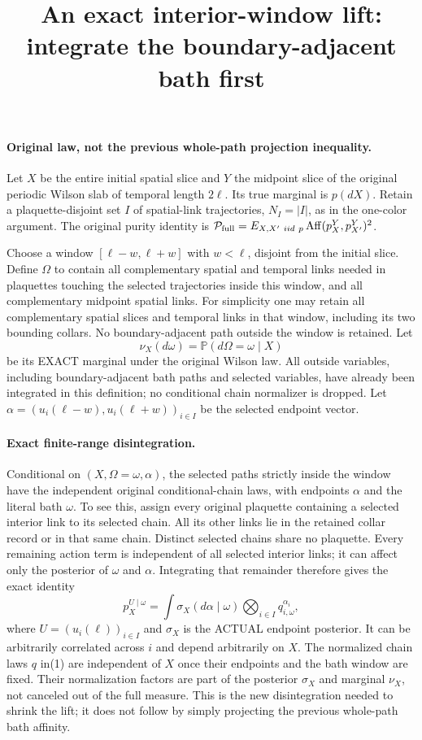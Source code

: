\documentclass[11pt]{article}
\title{An exact interior-window lift: integrate the boundary-adjacent bath first}\author{}\date{}
\begin{document}
\maketitle
\paragraph{Original law, not the previous whole-path projection inequality.}
Let $X$ be the entire initial spatial slice and $Y$ the midpoint slice of the
original periodic Wilson slab of temporal length $2\ell$. Its true marginal
is $p(dX)$. Retain a plaquette-disjoint set $I$ of spatial-link trajectories,
$N_I=|I|$, as in the one-color argument. The original purity identity is
$\mathcal P_{\rm full}=E_{X,X'\ iid\ p}\operatorname{Aff}(p_X^Y,p_{X'}^Y)^2$.

Choose a window $[\ell-w,\ell+w]$ with $w<\ell$, disjoint from the initial
slice. Define $\Omega$ to contain all complementary spatial and temporal links
needed in plaquettes touching the selected trajectories inside this window,
and all complementary midpoint spatial links. For simplicity one may retain
all complementary spatial slices and temporal links in that window, including
its two bounding collars. No boundary-adjacent path outside the window is
retained. Let
\[
 \nu_X(d\omega)=\mathbb P(d\Omega=\omega\mid X)
\]
be its EXACT marginal under the original Wilson law. All outside variables,
including boundary-adjacent bath paths and selected variables, have already
been integrated in this definition; no conditional chain normalizer is dropped.
Let $\alpha=(u_i(\ell-w),u_i(\ell+w))_{i\in I}$ be the selected endpoint vector.

\paragraph{Exact finite-range disintegration.}
Conditional on $(X,\Omega=\omega,\alpha)$, the selected paths strictly inside
the window have the independent original conditional-chain laws, with endpoints
$\alpha$ and the literal bath $\omega$. To see this, assign every original
plaquette containing a selected interior link to its selected chain. All its
other links lie in the retained collar record or in that same chain. Distinct
selected chains share no plaquette. Every remaining action term is independent
of all selected interior links; it can affect only the posterior of $\omega$
and $\alpha$. Integrating that remainder therefore gives the exact identity
\[
 p_X^{U\mid\omega}=\int\sigma_X(d\alpha\mid\omega)
                              \bigotimes_{i\in I}q_{i,\omega}^{\alpha_i}, \tag{1}
\]
where $U=(u_i(\ell))_{i\in I}$ and $\sigma_X$ is the ACTUAL endpoint posterior.
It can be arbitrarily correlated across $i$ and depend arbitrarily on $X$.
The normalized chain laws $q$ in(1) are independent of $X$ once their endpoints
and the bath window are fixed. Their normalization factors are part of the
posterior $\sigma_X$ and marginal $\nu_X$, not canceled out of the full measure.
This is the new disintegration needed to shrink the lift; it does not follow
by simply projecting the previous whole-path bath affinity.
\end{document}
